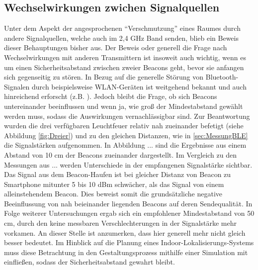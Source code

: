 \subsection{Wechselwirkungen zwichen Signalquellen} 
Unter dem Aspekt der angesprochenen "`Verschmutzung"' eines Raumes durch andere Signalquellen, welche auch im 2,4 GHz Band senden, blieb ein Beweis dieser Behauptungen bisher aus. Der Beweis oder generell die Frage nach Wechselwirkungen mit anderen Transmittern ist insoweit auch wichtig, wenn es um einen Sicherheitsabstand zwischen zweier Beacons geht, bevor sie anfangen sich gegenseitig zu stören. In Bezug auf die generelle Störung von Bluetooth-Signalen durch beispielsweise WLAN-Geräten ist weitgehend bekannt und auch hinreichend erforscht (z.B. \cite{InterBLEWLAN}). Jedoch bleibt die Frage, ob sich Beacons untereinander beeinflussen und wenn ja, wie groß der Mindestabstand gewählt werden muss, sodass die Auswirkungen vernachlässigbar sind. Zur Beantwortung wurden die drei verfügbaren Leuchtfeuer relativ nah zueinander befetigt (siehe Abbildung \ref{fig:Dreier}) und zu den gleichen Distanzen, wie in \ref{sec:MessungBLE} die Signalstärken aufgenommen. In Abbildung ... sind die Ergebnisse aus einem Abstand von 10 cm der Beacons zueinander dargestellt. Im Vergleich zu den Messungen aus ... werden Unterschiede in der empfangenen Signalstärke sichtbar. Das Signal aus dem Beacon-Haufen ist bei gleicher Distanz von Beacon zu Smartphone mitunter 5 bis 10 dBm schwächer, als das Signal von einem alleinstehendem Beacon. Dies beweist somit die grundsätzliche negative Beeinflussung von nah beieinander liegenden Beacons auf deren Sendequalität. In Folge weiterer Untersuchungen ergab sich ein empfohlener Mindestabstand von 50 cm, durch den keine messbaren Verschlechterungen in der Signalstärke mehr vorkamen. An dieser Stelle ist anzumerken, dass hier generell mehr nicht gleich besser bedeutet. Im Hinblick auf die Planung eines Indoor-Lokalisierungs-Systems muss diese Betrachtung in den Gestaltungsprozess mithilfe einer Simulation mit einfließen, sodass der Sicherheitsabstand gewahrt bleibt.

